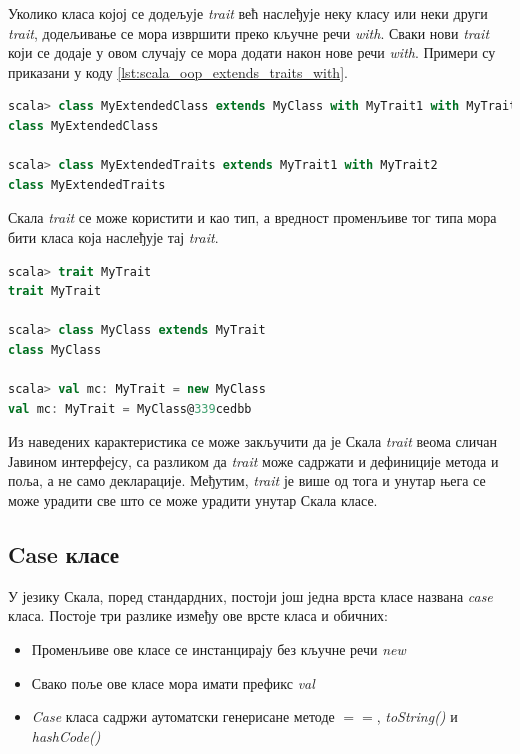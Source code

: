 \documentclass[12pt,oneside]{memoir}
\begin{document}
Уколико класа којој се додељује \textit{trait} већ наслеђује неку класу или неки други \textit{trait}, додељивање се мора извршити преко кључне речи \textit{with}. Сваки нови \textit{trait} који се додаје у овом случају се мора додати након нове речи \textit{with}. Примери су приказани у коду \ref{lst:scala_oop_extends_traits_with}. \cite{scala_prog}

\begin{lstlisting}[language=Scala, caption={Наслеђивање више \textit{trait}-ова}, label={lst:scala_oop_extends_traits_with}]
scala> class MyExtendedClass extends MyClass with MyTrait1 with MyTrait2
class MyExtendedClass

scala> class MyExtendedTraits extends MyTrait1 with MyTrait2
class MyExtendedTraits
\end{lstlisting}

Скала \textit{trait} се може користити и као тип, а вредност променљиве тог типа мора бити класа која наслеђује тај \textit{trait}.

\begin{lstlisting}[language=Scala, caption={\textit{Trait} као тип}, label={lst:scala_oop_traits_types}]
scala> trait MyTrait
trait MyTrait

scala> class MyClass extends MyTrait
class MyClass

scala> val mc: MyTrait = new MyClass
val mc: MyTrait = MyClass@339cedbb
\end{lstlisting}

Из наведених карактеристика се може закључити да је Скала \textit{trait} веома сличан Јавином интерфејсу, са разликом да \textit{trait} може садржати и дефиниције метода и поља, а не само декларације. Међутим, \textit{trait} је више од тога и унутар њега се може урадити све што се може урадити унутар Скала класе.

\subsection{Case класе}
\label{subsec:scala_case_klase}

У језику Скала, поред стандардних, постоји још једна врста класе названа \textit{case} класа. Постоје три разлике између ове врсте класа и обичних:

\begin{itemize}
\item Променљиве ове класе се инстанцирају без кључне речи \textit{new}
\item Свако поље ове класе мора имати префикс \textit{val}
\item \textit{Case} класа садржи аутоматски генерисане методе $==$, \textit{toString()} и \textit{hashCode()} 
\end{itemize}
\end{document}
